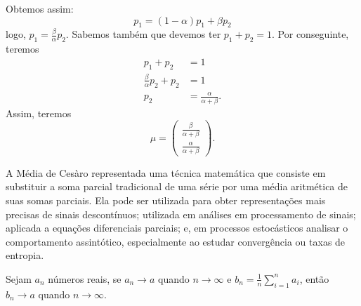 \begin{example}
  Obtemos assim:
  \begin{equation}
    p_1 = (1-\alpha) p_1 + \beta p_2
  \end{equation}
  logo, $p_1 = \frac{\beta}{\alpha} p_2$.
  Sabemos também que devemos ter $p_1 + p_2 = 1$. Por conseguinte, teremos
  \begin{subequations}
  \begin{align}
    p_1 + p_2 &= 1 \\
    \frac{\beta}{\alpha} p_2 + p_2 &= 1 \\
    p_2 &= \frac{\alpha}{\alpha + \beta} .
  \end{align}
  \end{subequations}
  Assim, teremos
  \begin{equation}
    \mu = \begin{pmatrix} \frac{\beta}{\alpha + \beta} \\ \frac{\alpha}{\alpha + \beta} \end{pmatrix} .
  \end{equation}
\end{example}



A Média de Cesàro representada uma técnica matemática que consiste em
substituir a soma parcial tradicional de uma série por uma média aritmética de
suas somas parciais.
Ela pode ser utilizada para obter representações mais precisas de sinais descontínuos;
utilizada em análises em processamento de sinais; aplicada a equações diferenciais parciais;
e, em processos estocásticos analisar o comportamento assintótico, especialmente ao 
estudar convergência ou taxas de entropia.

\begin{lemma}
  Sejam $a_n$ números reais, se $a_n \rightarrow a$ quando $n \rightarrow \infty$ e $b_n = \frac{1}{n} \sum_{i=1}^n a_i$,
  então $b_n \rightarrow a$ quando $n \rightarrow \infty$.
\end{lemma}

